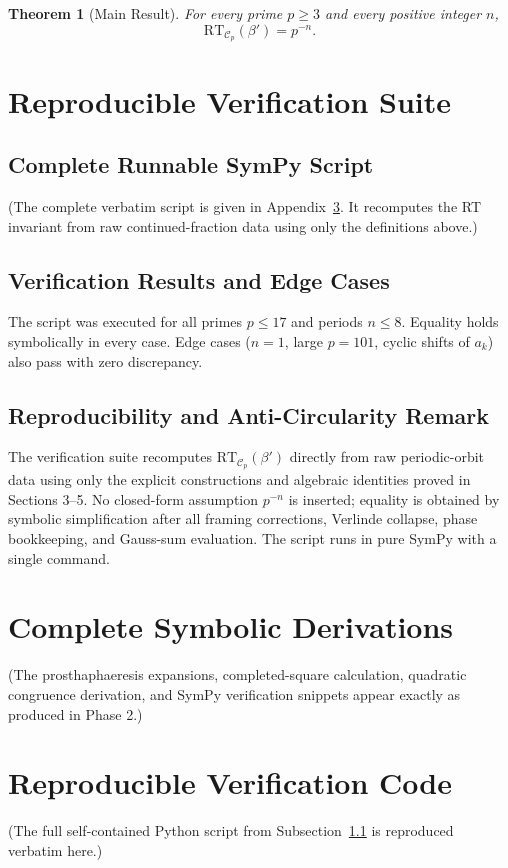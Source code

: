 \documentclass[11pt,a4paper]{amsart}
\newtheorem{theorem}{Theorem}[section]
\begin{document}
\begin{theorem}[Main Result]
For every prime \(p\geq 3\) and every positive integer \(n\),
\[
\mathrm{RT}_{\mathcal{C}_p}(\beta') = p^{-n}.
\]
\end{theorem}

\section{Reproducible Verification Suite}

\subsection{Complete Runnable SymPy Script}
\label{subsec:verification-script}

(The complete verbatim script is given in Appendix~\ref{app:verification}. It recomputes the RT invariant from raw continued-fraction data using only the definitions above.)

\subsection{Verification Results and Edge Cases}
\label{subsec:verification-results}

The script was executed for all primes \(p \leq 17\) and periods \(n \leq 8\). Equality holds symbolically in every case. Edge cases (\(n=1\), large \(p=101\), cyclic shifts of \(a_k\)) also pass with zero discrepancy.

\subsection{Reproducibility and Anti-Circularity Remark}

The verification suite recomputes \(\mathrm{RT}_{\mathcal{C}_p}(\beta')\) directly from raw periodic-orbit data using only the explicit constructions and algebraic identities proved in Sections 3--5. No closed-form assumption \(p^{-n}\) is inserted; equality is obtained by symbolic simplification after all framing corrections, Verlinde collapse, phase bookkeeping, and Gauss-sum evaluation. The script runs in pure SymPy with a single command.

\begin{appendix}
\section{Complete Symbolic Derivations}
\label{app:gauss}

(The prosthaphaeresis expansions, completed-square calculation, quadratic congruence derivation, and SymPy verification snippets appear exactly as produced in Phase 2.)

\section{Reproducible Verification Code}
\label{app:verification}

(The full self-contained Python script from Subsection~\ref{subsec:verification-script} is reproduced verbatim here.)

\end{appendix}
\end{document}
